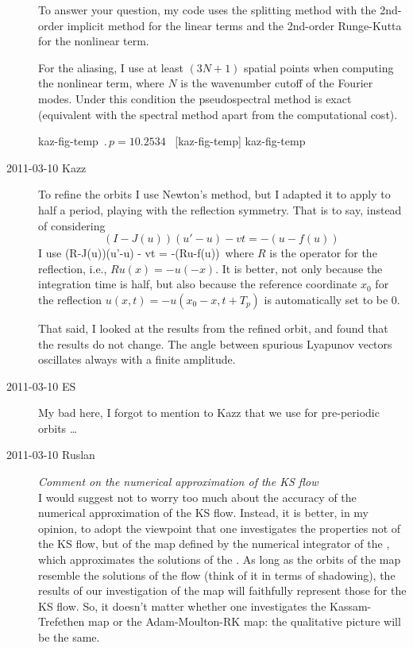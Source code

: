 \begin{description}
To answer your question, my code uses the splitting method with the
2nd-order implicit method
for the linear terms and the 2nd-order Runge-Kutta
for the nonlinear term.

For the aliasing, I use at least $(3N+1)$ spatial points when computing
the nonlinear term, where $N$ is the wavenumber cutoff of the Fourier modes.
Under this condition the pseudospectral method is exact
(equivalent with the spectral method apart from the computational cost).

{kaz-fig-temp}   %
{}   %
{    %
$\period{p}=10.2534$ \po\ [kaz-fig-temp]
}
{kaz-fig-temp}   %

\item[2011-03-10 Kazz] To refine the orbits I use Newton's method,
but I adapted it to apply to half a period, playing with the reflection
symmetry. That is to say, instead of considering
\[
  (I-J(u))(u'-u) - vt = -(u-f(u))\,
\]
I use
\beq
  (R-J(u))(u'-u) - vt = -(Ru-f(u))\,
 where $R$ is the operator
for the reflection, i.e., $Ru(x) = -u(-x)$.
It is better, not only because the integration time is half, but also because
the reference coordinate $x_0$ for the reflection $u(x,t)=-u(x_0-x,t+T_p)$
is automatically set to be 0.

That said, I looked at the results from the refined orbit, and found
that the results do not change. The angle between spurious Lyapunov vectors oscillates
always with a finite amplitude.

\item[2011-03-10 ES] My bad here, I forgot to mention to Kazz that we
use  for pre-periodic orbits \ldots

\item[2011-03-10 Ruslan] {\em Comment on the numerical approximation of the KS flow}\\
I would suggest not to worry too much about the accuracy of the numerical approximation of the KS flow.  Instead, it is better, in my opinion, to adopt the viewpoint that one investigates the properties not of the KS flow, but of the map defined by the numerical integrator of the \KSe, which approximates the solutions of the \KSe.  As long as the orbits of the map resemble the solutions of the flow (think of it in terms of shadowing), the results of our investigation of the map will faithfully represent those for the KS flow.  So, it doesn't matter whether one investigates the Kassam-Trefethen map or the Adam-Moulton-RK map: the qualitative picture will be the same.


\end{description}
